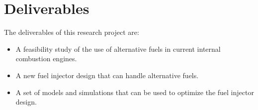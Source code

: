 \section{Deliverables}
\label{sec:deliverables}

The deliverables of this research project are:

\begin{itemize}
    \item A feasibility study of the use of alternative fuels in current internal combustion engines.
    \item A new fuel injector design that can handle alternative fuels.
    \item A set of models and simulations that can be used to optimize the fuel injector design.
\end{itemize}